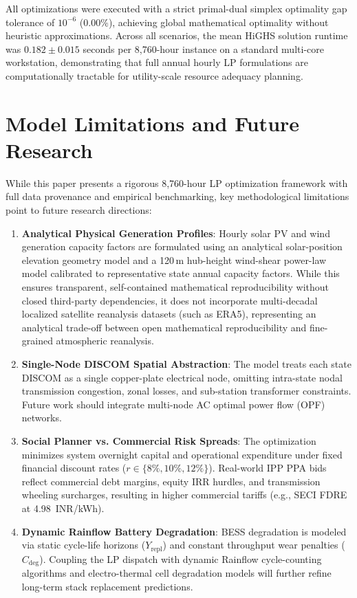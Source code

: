 \documentclass[11pt,a4paper]{article}
\begin{document}
All optimizations were executed with a strict primal-dual simplex optimality gap tolerance of $10^{-6}$ ($0.00\%$), achieving global mathematical optimality without heuristic approximations. Across all scenarios, the mean HiGHS solution runtime was $0.182 \pm 0.015$ seconds per 8,760-hour instance on a standard multi-core workstation, demonstrating that full annual hourly LP formulations are computationally tractable for utility-scale resource adequacy planning.

\section{Model Limitations and Future Research}
\label{sec:limitations}

While this paper presents a rigorous 8,760-hour LP optimization framework with full data provenance and empirical benchmarking, key methodological limitations point to future research directions:
\begin{enumerate}
    \item \textbf{Analytical Physical Generation Profiles}: Hourly solar PV and wind generation capacity factors are formulated using an analytical solar-position elevation geometry model and a 120\,m hub-height wind-shear power-law model calibrated to representative state annual capacity factors. While this ensures transparent, self-contained mathematical reproducibility without closed third-party dependencies, it does not incorporate multi-decadal localized satellite reanalysis datasets (such as ERA5), representing an analytical trade-off between open mathematical reproducibility and fine-grained atmospheric reanalysis.
    \item \textbf{Single-Node DISCOM Spatial Abstraction}: The model treats each state DISCOM as a single copper-plate electrical node, omitting intra-state nodal transmission congestion, zonal losses, and sub-station transformer constraints. Future work should integrate multi-node AC optimal power flow (OPF) networks.
    \item \textbf{Social Planner vs. Commercial Risk Spreads}: The optimization minimizes system overnight capital and operational expenditure under fixed financial discount rates ($r \in \{8\%, 10\%, 12\%\}$). Real-world IPP PPA bids reflect commercial debt margins, equity IRR hurdles, and transmission wheeling surcharges, resulting in higher commercial tariffs (e.g., SECI FDRE at 4.98~INR/kWh).
    \item \textbf{Dynamic Rainflow Battery Degradation}: BESS degradation is modeled via static cycle-life horizons ($Y_{\text{repl}}$) and constant throughput wear penalties ($C_{\text{deg}}$). Coupling the LP dispatch with dynamic Rainflow cycle-counting algorithms and electro-thermal cell degradation models will further refine long-term stack replacement predictions.
\end{enumerate}
\end{document}
